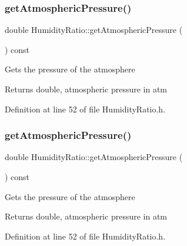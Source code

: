 \subsubsection{\texorpdfstring{get\+Atmospheric\+Pressure()}{getAtmosphericPressure()}\hspace{0.1cm}{\footnotesize\ttfamily [1/3]}}
{\footnotesize\ttfamily double Humidity\+Ratio\+::get\+Atmospheric\+Pressure (\begin{DoxyParamCaption}{ }\end{DoxyParamCaption}) const\hspace{0.3cm}{\ttfamily [inline]}}

Gets the pressure of the atmosphere

\begin{DoxyReturn}{Returns}
double, atmospheric pressure in atm 
\end{DoxyReturn}


Definition at line 52 of file Humidity\+Ratio.\+h.

\mbox{\label{class_humidity_ratio_a7814687795a87a3822e4584773938741}} 
\subsubsection{\texorpdfstring{get\+Atmospheric\+Pressure()}{getAtmosphericPressure()}\hspace{0.1cm}{\footnotesize\ttfamily [2/3]}}
{\footnotesize\ttfamily double Humidity\+Ratio\+::get\+Atmospheric\+Pressure (\begin{DoxyParamCaption}{ }\end{DoxyParamCaption}) const\hspace{0.3cm}{\ttfamily [inline]}}

Gets the pressure of the atmosphere

\begin{DoxyReturn}{Returns}
double, atmospheric pressure in atm 
\end{DoxyReturn}


Definition at line 52 of file Humidity\+Ratio.\+h.

\mbox{\label{class_humidity_ratio_a7814687795a87a3822e4584773938741}} 
